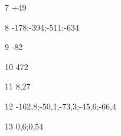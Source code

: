 \begin{loigiaibt}{7}
 +49
\end{loigiaibt}
\begin{loigiaibt}{8}
 -178;-394;-511;-634
\end{loigiaibt}
\begin{loigiaibt}{9}
 -82
\end{loigiaibt}
\begin{loigiaibt}{10}
 472
\end{loigiaibt}
\begin{loigiaibt}{11}
 8,27
\end{loigiaibt}
\begin{loigiaibt}{12}
 -162,8;-50,1,-73,3;-45,6;-66,4
\end{loigiaibt}
\begin{loigiaibt}{13}
 0,6;0,54
\end{loigiaibt}

